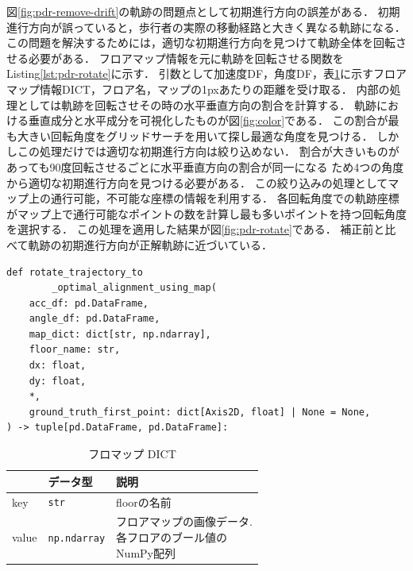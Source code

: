 
図\ref{fig:pdr-remove-drift}の軌跡の問題点として初期進行方向の誤差がある．
初期進行方向が誤っていると，歩行者の実際の移動経路と大きく異なる軌跡になる．
この問題を解決するためには，適切な初期進行方向を見つけて軌跡全体を回転させる必要がある．
フロアマップ情報を元に軌跡を回転させる関数をListing\ref{lst:pdr-rotate}に示す．
引数として加速度DF，角度DF，表\ref{tab:map_dict}に示すフロアマップ情報DICT，フロア名，マップの1pxあたりの距離を受け取る．
内部の処理としては軌跡を回転させその時の水平垂直方向の割合を計算する．
軌跡における垂直成分と水平成分を可視化したものが図\ref{fig:color}である．
この割合が最も大きい回転角度をグリッドサーチを用いて探し最適な角度を見つける．
しかしこの処理だけでは適切な初期進行方向は絞り込めない．
割合が大きいものがあっても90度回転させるごとに水平垂直方向の割合が同一になる
ため4つの角度から適切な初期進行方向を見つける必要がある．
この絞り込みの処理としてマップ上の通行可能，不可能な座標の情報を利用する．
各回転角度での軌跡座標がマップ上で通行可能なポイントの数を計算し最も多いポイントを持つ回転角度を選択する．
この処理を適用した結果が図\ref{fig:pdr-rotate}である．
補正前と比べて軌跡の初期進行方向が正解軌跡に近づいている．

\begin{lstlisting}[caption={初期進行方向補正}, label=lst:pdr-rotate]
def rotate_trajectory_to
		_optimal_alignment_using_map(
    acc_df: pd.DataFrame,
    angle_df: pd.DataFrame,
    map_dict: dict[str, np.ndarray],
    floor_name: str,
    dx: float,
    dy: float,
    *,
    ground_truth_first_point: dict[Axis2D, float] | None = None,
) -> tuple[pd.DataFrame, pd.DataFrame]:
\end{lstlisting}

\begin{table}[ht]
	\centering
	\begin{tabular}{lll}
		\hline
		      & \textbf{データ型}       & \textbf{説明}             \\ \hline
		key   & \texttt{str}        & floorの名前                \\ \hline
		value & \texttt{np.ndarray} & \makecell{フロアマップの画像データ. \\各フロアのブール値の\\NumPy配列} \\ \hline
	\end{tabular}
	\caption{フロマップ DICT}
	\label{tab:map_dict}
\end{table}

